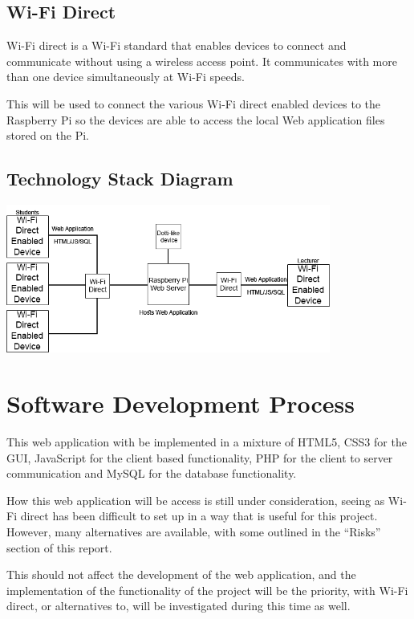 \documentclass{article}
\begin{document}
\subsection{Wi-Fi Direct}
Wi-Fi direct is a Wi-Fi standard that enables devices to connect and communicate without using a wireless access point. It communicates with more than one device simultaneously at Wi-Fi speeds.

This will be used to connect the various Wi-Fi direct enabled devices to the Raspberry Pi so the devices are able to access the local Web application files stored on the Pi.

\subsection{Technology Stack Diagram}
\begin{center}
\includegraphics[width=0.8\textwidth]{stackdiagram.png}
\end{center}

\section{Software Development Process}
This web application with be implemented in a mixture of HTML5, CSS3 for the GUI, JavaScript for the client based functionality, PHP for the client to server communication and MySQL for the database functionality.

How this web application will be access is still under consideration, seeing as Wi-Fi direct has been difficult to set up in a way that is useful for this project. However, many alternatives are available, with some outlined in the ``Risks'' section of this report.

This should not affect the development of the web application, and the implementation of the functionality of the project will be the priority, with Wi-Fi direct, or alternatives to, will be investigated during this time as well.
\end{document}
